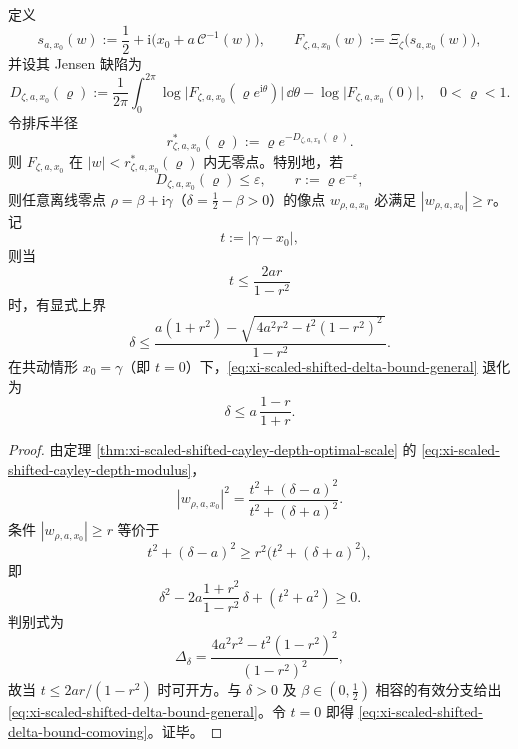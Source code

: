 \begin{theorem}\label{thm:xi-scaled-shifted-jensen-implies-delta-bound}
定义
\[
s_{a,x_0}(w):=\frac12+\mathrm{i}\bigl(x_0+a\,\mathcal C^{-1}(w)\bigr),
\qquad
F_{\zeta,a,x_0}(w):=\Xi_\zeta\!\bigl(s_{a,x_0}(w)\bigr),
\]
并设其 Jensen 缺陷为
\[
D_{\zeta,a,x_0}(\varrho)
:=\frac1{2\pi}\int_0^{2\pi}\log\!\bigl|F_{\zeta,a,x_0}(\varrho e^{\mathrm{i}\theta})\bigr|\,\dd\theta
-\log\!\bigl|F_{\zeta,a,x_0}(0)\bigr|,
\quad 0<\varrho<1.
\]
令排斥半径
\[
r_{\zeta,a,x_0}^\ast(\varrho):=\varrho e^{-D_{\zeta,a,x_0}(\varrho)}.
\]
则 \(F_{\zeta,a,x_0}\) 在 \(|w|<r_{\zeta,a,x_0}^\ast(\varrho)\) 内无零点。特别地，若
\[
D_{\zeta,a,x_0}(\varrho)\le \varepsilon,\qquad
r:=\varrho e^{-\varepsilon},
\]
则任意离线零点 \(\rho=\beta+\mathrm{i}\gamma\)（\(\delta=\tfrac12-\beta>0\)）的像点 \(w_{\rho,a,x_0}\) 必满足 \(|w_{\rho,a,x_0}|\ge r\)。
记
\[
t:=|\gamma-x_0|,
\]
则当
\[
t\le \frac{2ar}{1-r^2}
\]
时，有显式上界
\begin{equation}\label{eq:xi-scaled-shifted-delta-bound-general}
\delta\le
\frac{a(1+r^2)-\sqrt{\,4a^2r^2-t^2(1-r^2)^2\,}}{1-r^2}.
\end{equation}
在共动情形 \(x_0=\gamma\)（即 \(t=0\)）下，\eqref{eq:xi-scaled-shifted-delta-bound-general} 退化为
\begin{equation}\label{eq:xi-scaled-shifted-delta-bound-comoving}
\delta\le a\,\frac{1-r}{1+r}.
\end{equation}
\end{theorem}
\begin{proof}
由定理 \ref{thm:xi-scaled-shifted-cayley-depth-optimal-scale} 的
\eqref{eq:xi-scaled-shifted-cayley-depth-modulus}，
\[
|w_{\rho,a,x_0}|^2
=\frac{t^2+(\delta-a)^2}{t^2+(\delta+a)^2}.
\]
条件 \(|w_{\rho,a,x_0}|\ge r\) 等价于
\[
t^2+(\delta-a)^2\ge r^2\bigl(t^2+(\delta+a)^2\bigr),
\]
即
\[
\delta^2-2a\frac{1+r^2}{1-r^2}\,\delta+(t^2+a^2)\ge 0.
\]
判别式为
\[
\Delta_\delta
=\frac{4a^2r^2-t^2(1-r^2)^2}{(1-r^2)^2},
\]
故当 \(t\le 2ar/(1-r^2)\) 时可开方。与 \(\delta>0\) 及 \(\beta\in(0,\tfrac12)\) 相容的有效分支给出
\eqref{eq:xi-scaled-shifted-delta-bound-general}。令 \(t=0\) 即得
\eqref{eq:xi-scaled-shifted-delta-bound-comoving}。证毕。
\end{proof}

